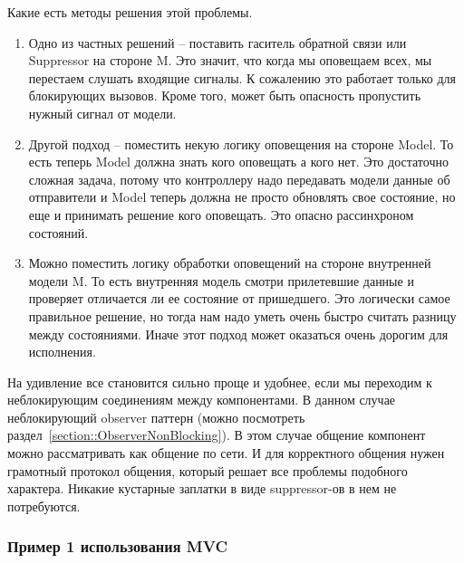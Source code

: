 Какие есть методы решения этой проблемы.
\begin{enumerate}
\item Одно из частных решений -- поставить гаситель обратной связи или Suppressor на стороне M.
Это значит, что когда мы оповещаем всех, мы перестаем слушать входящие сигналы.
К сожалению это работает только для блокирующих вызовов.
Кроме того, может быть опасность пропустить нужный сигнал от модели.

\item Другой подход -- поместить некую логику оповещения на стороне Model.
То есть теперь Model должна знать кого оповещать а кого нет.
Это достаточно сложная задача, потому что контроллеру надо передавать модели данные об отправители и Model теперь должна не просто обновлять свое состояние, но еще и принимать решение кого оповещать.
Это опасно рассинхроном состояний.

\item Можно поместить логику обработки оповещений на стороне внутренней модели M.
То есть внутренняя модель смотри прилетевшие данные и проверяет отличается ли ее состояние от пришедшего.
Это логически самое правильное решение, но тогда нам надо уметь очень быстро считать разницу между состояниями.
Иначе этот подход может оказаться очень дорогим для исполнения.
\end{enumerate}
На удивление все становится сильно проще и удобнее, если мы переходим к неблокирующим соединениям между компонентами.
В данном случае неблокирующий observer паттерн (можно посмотреть раздел~\ref{section::ObserverNonBlocking}).
В этом случае общение компонент можно рассматривать как общение по сети.
И для корректного общения нужен грамотный протокол общения, который решает все проблемы подобного характера.
Никакие кустарные заплатки в виде suppressor-ов в нем не потребуются.

\subsubsection{Пример 1 использования MVC}

